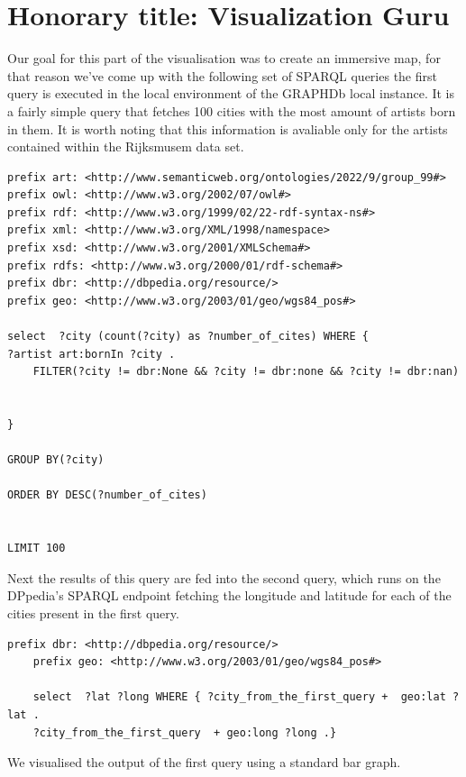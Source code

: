 \documentclass{article}
\begin{document}
\section{Honorary title: Visualization Guru}

Our goal for this part of the visualisation was to create an immersive map, for that reason we've come up with the following set of SPARQL queries the first query is executed in the local environment of the GRAPHDb local instance. It is a fairly simple query that fetches 100 cities with the most amount of artists born in them. It is worth noting that this information is avaliable only for the artists contained within the Rijksmusem data set. 

\begin{verbatim}
prefix art: <http://www.semanticweb.org/ontologies/2022/9/group_99#> 
prefix owl: <http://www.w3.org/2002/07/owl#> 
prefix rdf: <http://www.w3.org/1999/02/22-rdf-syntax-ns#> 
prefix xml: <http://www.w3.org/XML/1998/namespace> 
prefix xsd: <http://www.w3.org/2001/XMLSchema#> 
prefix rdfs: <http://www.w3.org/2000/01/rdf-schema#> 
prefix dbr: <http://dbpedia.org/resource/>
prefix geo: <http://www.w3.org/2003/01/geo/wgs84_pos#>

select  ?city (count(?city) as ?number_of_cites) WHERE { 
?artist art:bornIn ?city .
    FILTER(?city != dbr:None && ?city != dbr:none && ?city != dbr:nan)
 

}

GROUP BY(?city)

ORDER BY DESC(?number_of_cites)


LIMIT 100
\end{verbatim}


Next the results of this query are fed into the second query, which runs on the DPpedia's SPARQL endpoint fetching the longitude and latitude for each of the cities present in the first query. 

\begin{verbatim}
prefix dbr: <http://dbpedia.org/resource/>
    prefix geo: <http://www.w3.org/2003/01/geo/wgs84_pos#>

    select  ?lat ?long WHERE { ?city_from_the_first_query +  geo:lat ?lat . 
    ?city_from_the_first_query  + geo:long ?long .}
\end{verbatim}

We visualised the output of the first query using a standard bar graph. 
\end{document}
